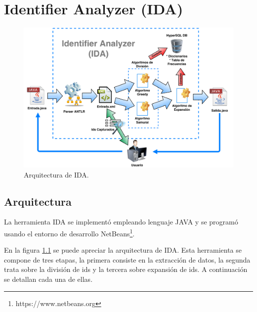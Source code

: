 \documentclass[a4paper,12pt]{report}
\begin{document}


\chapter{Identifier Analyzer (IDA)}

\pagebreak
\begin{figure}[ht] %
\centering
\includegraphics[scale= 0.35]{./ida_arq.png}
\caption{Arquitectura de IDA.}
\label{arq1}
\end{figure}

\section{Arquitectura}

La herramienta IDA se implementó empleando lenguaje JAVA y se programó usando el entorno de desarrollo NetBeans\footnote[1]{https://www.netbeans.org}. 

En la figura \ref{arq1} se puede apreciar la arquitectura de IDA. Esta herramienta se compone de tres etapas, la primera consiste en la extracción de datos, la segunda trata sobre la división de ids y la tercera sobre expansión de ids. A continuación se detallan cada una de ellas.
\end{document}
